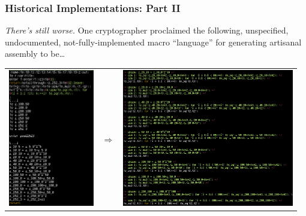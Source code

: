 \documentclass[xetex,aspectratio=169]{beamer}
\begin{document}
 \begin{frame}
   \frametitle{Historical Implementations: Part II}

   \emph{There's still worse.} \pause One cryptographer proclaimed the
   following, unspecified, undocumented, not-fully-implemented macro
   ``language'' for generating artisanal assembly to be…

   \pause \begin{tabular}{ccc}
     \includegraphics[height=6cm]{quackery-before.jpg} &
                     {\LARGE $\Rightarrow$} &
     \includegraphics[height=6cm]{quackery-after.jpg}
   \end{tabular}
 \end{frame}
\end{document}
